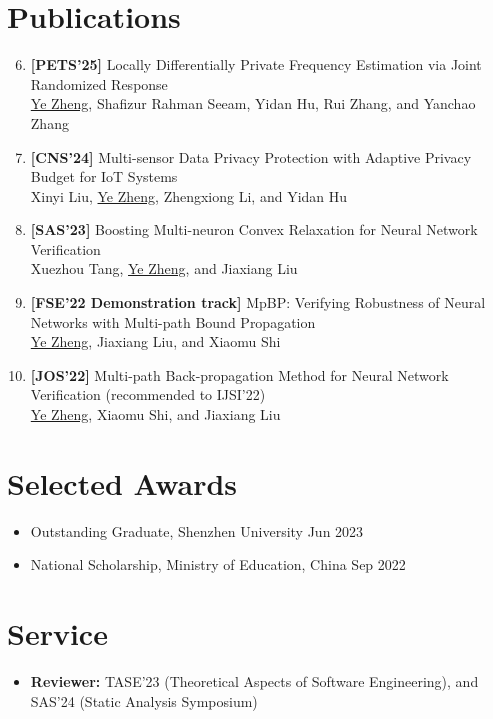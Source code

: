 \documentclass[a4paper,11pt]{article}
\begin{document}
\section{\textbf{Publications}}

\begin{enumerate}[leftmargin=*,labelsep=2mm]
  \setcounter{enumi}{5} %
  \addtocounter{enumi}{-1}
  \item \textbf{[PETS'25]} Locally Differentially Private Frequency Estimation via Joint Randomized Response \\
  \uline{Ye Zheng}, Shafizur Rahman Seeam, Yidan Hu, Rui Zhang, and Yanchao Zhang
  \addtocounter{enumi}{-2}
  \item \textbf{[CNS'24]} Multi-sensor Data Privacy Protection with Adaptive Privacy Budget for IoT Systems \\
  Xinyi Liu, \uline{Ye Zheng}, Zhengxiong Li, and Yidan Hu
  \addtocounter{enumi}{-2}
  \item \textbf{[SAS'23]} Boosting Multi-neuron Convex Relaxation for Neural Network Verification \\
  Xuezhou Tang, \uline{Ye Zheng}, and Jiaxiang Liu
  \addtocounter{enumi}{-2}
  \item \textbf{[FSE'22 Demonstration track]} MpBP: Verifying Robustness of Neural Networks with Multi-path Bound Propagation \\
  \uline{Ye Zheng}, Jiaxiang Liu, and Xiaomu Shi
  \addtocounter{enumi}{-2}
  \item \textbf{[JOS'22]} Multi-path Back-propagation Method for Neural Network Verification (recommended to IJSI'22)\\
  \uline{Ye Zheng}, Xiaomu Shi, and Jiaxiang Liu
\end{enumerate}


\section{\textbf{Selected Awards}}

\begin{itemize}[leftmargin=0pt,label={}]
  \item Outstanding Graduate, Shenzhen University \hfill Jun 2023\vspace{-0.5em}
  \item National Scholarship, Ministry of Education, China \hfill Sep 2022
\end{itemize}


\section{\textbf{Service}}

\begin{itemize}[leftmargin=0pt,label={}]
  \item \textbf{Reviewer:} TASE'23 (Theoretical Aspects of Software Engineering), and SAS'24 (Static Analysis Symposium)
\end{itemize}
\end{document}
